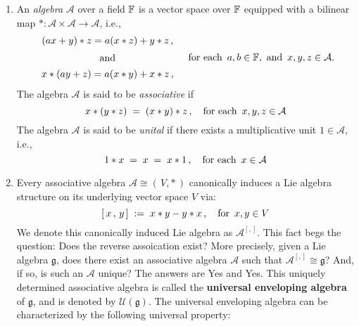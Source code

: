 \begin{enumerate}
\item
	An \textit{algebra} $\mathcal{A}$ over a field $\mathbb{F}$ is a vector space over $\mathbb{F}$
	equipped with a bilinear map $* : \mathcal{A} \times \mathcal{A} \longrightarrow \mathcal{A}$, i.e.,
	\begin{equation*}
	\begin{array}{c}
		(a x + y) * z = a (x * z) + y * z\,,
		\\
		\underset{{\color{white}-}}{\overset{{\color{white}-}}{\textnormal{and}}}
		\\
		x * (a y + z) = a(x * y) + x * z\,,
	\end{array}
	\quad
	\textnormal{for each \,$a, b \in \F$,\, and \,$x, y, z \in \mathcal{A}$}.
	\end{equation*}
	The algebra $\mathcal{A}$ is said to be \textit{associative} if
	\begin{equation*}
	x * (y * z) \; = \; (x * y) * z\,,
	\quad
	\textnormal{for each \,$x, y, z \in \mathcal{A}$}
	\end{equation*}
	The algebra $\mathcal{A}$ is said to be \textit{unital} if
	there exists a multiplicative unit $1 \in \mathcal{A}$, i.e.,
	\begin{equation*}
	1 * x \; = \; x \; = \; x * 1\,,
	\quad
	\textnormal{for each \,$x \in \mathcal{A}$}
	\end{equation*}
\item
	Every associative algebra $\mathcal{A} \cong (\,V,*\,)$
	canonically induces a Lie algebra structure on its underlying vector space $V$ via:
	\begin{equation*}
	\left[\,x\,,\,y\,\right] \; := \; x * y - y * x\,,
	\quad
	\textnormal{for \,$x, y \in V$}
	\end{equation*}
	We denote this canonically induced Lie algebra as $\mathcal{A}^{[,]}$.
	\vskip 0.2cm
	This fact begs the question:
	Does the reverse assoication exist? More precisely, given a Lie algebra $\mathfrak{g}$,
	does there exist an associative algebra $\mathcal{A}$ such that $\mathcal{A}^{[,]} \cong \mathfrak{g}$?
	And, if so, is such an $\mathcal{A}$ unique?
	\vskip 0.2cm
	The answers are Yes and Yes.
	This uniquely determined associative algebra is called the
	\textbf{universal enveloping algebra} of $\mathfrak{g}$,
	and is denoted by $\mathcal{U}(\mathfrak{g})$.
	\vskip 0.1cm
	The universal enveloping algebra can be characterized by the following universal property:
	\begin{center}
	\begin{minipage}{5.25in}

\end{minipage}
\end{center}
\end{enumerate}
